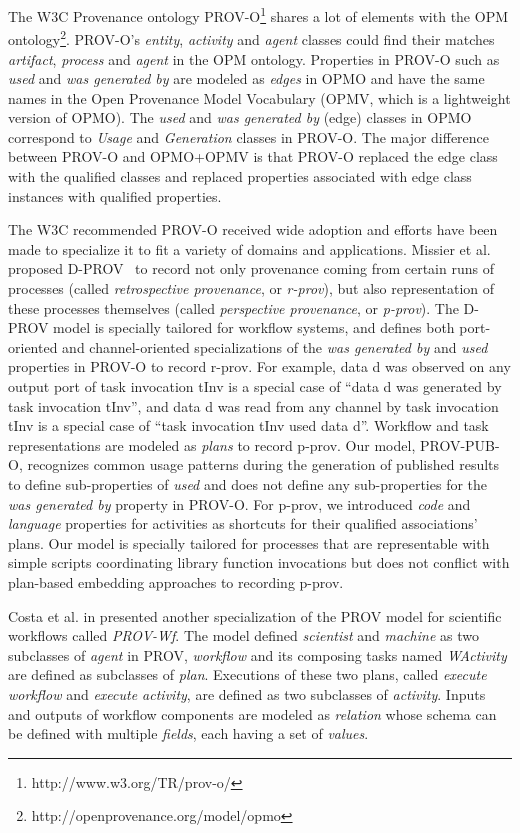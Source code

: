 The W3C Provenance ontology PROV-O\footnote{http://www.w3.org/TR/prov-o/} shares a lot of elements with the OPM ontology\footnote{http://openprovenance.org/model/opmo}. PROV-O's \emph{entity}, \emph{activity} and \emph{agent} classes could find their matches \emph{artifact}, \emph{process} and \emph{agent} in the OPM ontology. Properties in PROV-O such as \emph{used} and \emph{was generated by} are modeled as \emph{edges} in OPMO and have the same names in the Open Provenance Model Vocabulary (OPMV, which is a lightweight version of OPMO). The \emph{used} and \emph{was generated by} (edge) classes in OPMO correspond to \emph{Usage} and \emph{Generation} classes in PROV-O. The major difference between PROV-O and OPMO+OPMV is that PROV-O replaced the edge class with the qualified classes and replaced properties associated with edge class instances with qualified properties. 

The W3C recommended PROV-O received wide adoption and efforts have been made to specialize it to fit a variety of domains and applications. Missier et al. proposed D-PROV~\cite{missier2013d} to record not only provenance coming from certain runs of processes (called \emph{retrospective provenance}, or \emph{r-prov}), but also representation of these processes themselves (called \emph{perspective provenance}, or \emph{p-prov}). The D-PROV model is specially tailored for workflow systems, and defines both port-oriented and channel-oriented specializations of the \emph{was generated by} and \emph{used} properties in PROV-O to record r-prov. For example, data d was observed on any output port of task invocation tInv is a special case of ``data d was generated by task invocation tInv'',  and data d was read from any channel by task invocation tInv is a special case of ``task invocation tInv used data d''. Workflow and task representations are modeled as \emph{plans} to record p-prov. Our model, PROV-PUB-O, recognizes common usage patterns during the generation of published results to define sub-properties of \emph{used} and does not define any sub-properties for the \emph{was generated by} property in PROV-O. For p-prov, we introduced \emph{code} and \emph{language} properties for activities as shortcuts for their qualified associations' plans. Our model is specially tailored for processes that are representable with simple scripts coordinating library function invocations but does not conflict with plan-based embedding approaches to recording p-prov.

Costa et al. in \cite{costa2013capturing} presented another specialization of the PROV model for scientific workflows called \emph{PROV-Wf}. The model defined \emph{scientist} and \emph{machine} as two subclasses of \emph{agent} in PROV, \emph{workflow} and its composing tasks named \emph{WActivity} are defined as subclasses of \emph{plan}. Executions of these two plans, called \emph{execute workflow} and \emph{execute activity}, are defined as two subclasses of \emph{activity}. Inputs and outputs of workflow components are modeled as \emph{relation} whose schema can be defined with multiple \emph{fields}, each having a set of \emph{values}.

